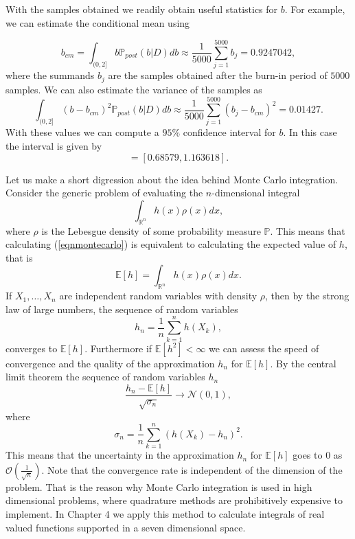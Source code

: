 \documentclass{sfuthesis}
\newcommand{\post}{\mathbb{P}_{post}}
\newcommand{\p}{\mathbb{P}}
\begin{document}
With the samples obtained we readily obtain useful statistics for $b$. For example, we can estimate
the conditional mean using \cite{casella2008monte}

\begin{equation}\label{eqnbcmMC}
b_{cm}=\int_{(0,2]}b\post(b|D)db\approx\frac{1}{5000}\sum_{j=1}^{5000}b_{j}=0.9247042,
\end{equation}
where the summands $b_{j}$ are the samples obtained after the burn-in period of $5000$ samples. We can 
also estimate the variance of the samples as
\begin{equation*}
\int_{(0,2]}(b-b_{cm})^{2}\post(b|D)db\approx\frac{1}{5000}\sum_{j=1}^{5000}(b_{j}-b_{cm})^{2}=0.01427.
\end{equation*}
With these values we can compute a $95\%$ confidence interval for $b$. In this
case the interval is given by 
\begin{equation*}
[0.9247042-2\sqrt{0.01427},0.92470422+2\sqrt{0.01427}]=[0.68579,1.163618].
\end{equation*}


Let us make a short digression about the idea behind Monte Carlo integration. 
Consider the generic problem of evaluating the $n$-dimensional
integral
\begin{equation}\label{eqnmontecarlo}
\int_{\mathbb{R}^{n}}h(x)\rho(x)dx,
\end{equation}  
where $\rho$ is the Lebesgue density of some probability measure $\p$. This means that calculating (\ref{eqnmontecarlo}) 
is equivalent to calculating the expected value of $h$, that is
\begin{equation*}
\mathbb{E}[h]=\int_{\mathbb{R}^{n}}h(x)\rho(x)dx.
\end{equation*}
If  $X_{1},\ldots,X_{n}$ are independent random variables  with density $\rho$, then by the strong law of large numbers, the sequence of random
variables
\begin{equation*}
h_{n}=\frac{1}{n}\sum_{k=1}^{n} h(X_{k}),
\end{equation*}
converges to $\mathbb{E}[h]$\cite{dudley2002real}. Furthermore if $\mathbb{E}[h^{2}]<\infty$ we can assess the speed of
convergence and the quality of the approximation $h_{n}$ for $\mathbb{E}[h]$. By the central limit theorem
the sequence of random  variables $h_{n}$
\begin{equation*}
\frac{h_{n}-\mathbb{E}[h]}{\sqrt{\sigma_{n}}}\rightarrow \mathcal{N}(0,1),
\end{equation*}
where 
\begin{equation*}
\sigma_{n}=\frac{1}{n}\sum_{k=1}^{n}(h(X_{k})-h_{n})^{2}.
\end{equation*}
This means that the uncertainty in the approximation $h_{n}$ for $\mathbb{E}[h]$ goes to $0$ as $\mathcal{O}(\frac{1}{\sqrt{n}})$.
Note that the convergence rate is independent of the dimension of the problem. That is the reason why Monte Carlo integration
is used in high dimensional problems, where quadrature methods are prohibitively  expensive to implement. In Chapter 4 we  apply 
this method to calculate integrals of real valued functions supported in a seven dimensional space.
\end{document}
